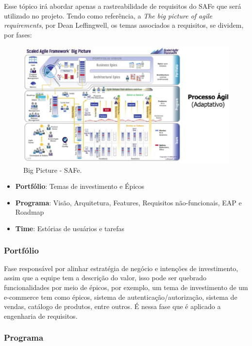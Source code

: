 Esse tópico irá abordar apenas a rastreabilidade de requisitos do SAFe que será utilizado no projeto. Tendo como
referência, a \textit{The big picture of agile requirements}, por Dean Leffingwell, os temas associados a requisitos, se
dividem, por fases: \cite{safe}

\begin{figure}[h!]
	\centering
  \includegraphics[keepaspectratio=true,scale=0.5]{figuras/safe.eps}
  \caption{Big Picture - SAFe.}
	\label{fig:safe}
\end{figure}

\begin{itemize}
  \item \textbf{Portfólio}: Temas de investimento e Épicos
  \item \textbf{Programa}: Visão, Arquitetura, Features, Requisitos não-funcionais, EAP e Roadmap
  \item \textbf{Time}: Estórias de usuários e tarefas
\end{itemize}

\subsubsection{Portfólio}

Fase responsável por alinhar estratégia de negócio e intenções de investimento, assim que a equipe tem a descrição do valor, isso pode ser quebrado funcionalidades por meio de épicos, por exemplo, um tema de investimento de um e-commerce tem como épicos, sistema de autenticação/autorização, sistema de vendas, catálogo de produtos, entre outros. É nessa fase que é aplicado a engenharia de requisitos.

\subsubsection{Programa}

